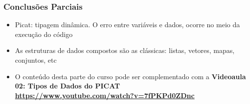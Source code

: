 \begin{frame}[fragile]
\frametitle{Conclusões Parciais}

\begin{itemize}

  \item Picat: tipagem dinâmica. O erro entre variáveis e dados, ocorre 
  no meio da execução do código

\pause
\item As estruturas de dados compostos são as clássicas: 
      listas, vetores, mapas, conjuntos, etc

\pause
  \item O conteúdo desta parte do curso pode ser complementado
  com a   \textbf{Videoaula 02: Tipos de Dados do PICAT}\\
    \textbf{\url {https://www.youtube.com/watch?v=7fPKPd0ZDnc}} 

\end{itemize}

\end{frame}

